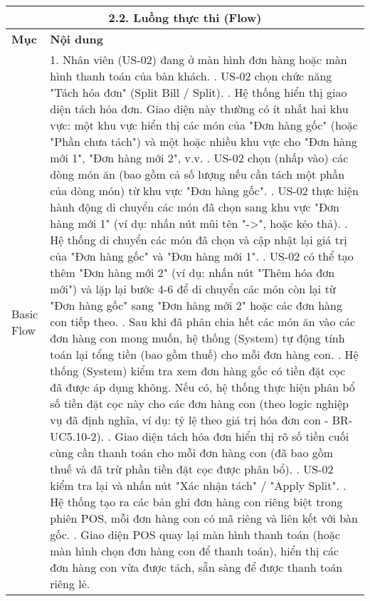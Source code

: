 \begin{longtable}{|m{4cm}|p{11cm}|}
\hline
\multicolumn{2}{|c|}{\textbf{2.2. Luồng thực thi (Flow)}} \\
\hline
\textbf{Mục} & \textbf{Nội dung} \\
\hline
Basic Flow & 1. Nhân viên (US-02) đang ở màn hình đơn hàng hoặc màn hình thanh toán của bàn khách. \newline 2. US-02 chọn chức năng "Tách hóa đơn" (Split Bill / Split). \newline 3. Hệ thống hiển thị giao diện tách hóa đơn. Giao diện này thường có ít nhất hai khu vực: một khu vực hiển thị các món của "Đơn hàng gốc" (hoặc "Phần chưa tách") và một hoặc nhiều khu vực cho "Đơn hàng mới 1", "Đơn hàng mới 2", v.v. \newline 4. US-02 chọn (nhấp vào) các dòng món ăn (bao gồm cả số lượng nếu cần tách một phần của dòng món) từ khu vực "Đơn hàng gốc". \newline 5. US-02 thực hiện hành động di chuyển các món đã chọn sang khu vực "Đơn hàng mới 1" (ví dụ: nhấn nút mũi tên "->", hoặc kéo thả). \newline 6. Hệ thống di chuyển các món đã chọn và cập nhật lại giá trị của "Đơn hàng gốc" và "Đơn hàng mới 1". \newline 7. US-02 có thể tạo thêm "Đơn hàng mới 2" (ví dụ: nhấn nút "Thêm hóa đơn mới") và lặp lại bước 4-6 để di chuyển các món còn lại từ "Đơn hàng gốc" sang "Đơn hàng mới 2" hoặc các đơn hàng con tiếp theo. \newline 8. Sau khi đã phân chia hết các món ăn vào các đơn hàng con mong muốn, hệ thống (System) tự động tính toán lại tổng tiền (bao gồm thuế) cho mỗi đơn hàng con. \newline 9. Hệ thống (System) kiểm tra xem đơn hàng gốc có tiền đặt cọc đã được áp dụng không. Nếu có, hệ thống thực hiện phân bổ số tiền đặt cọc này cho các đơn hàng con (theo logic nghiệp vụ đã định nghĩa, ví dụ: tỷ lệ theo giá trị hóa đơn con - BR-UC5.10-2). \newline 10. Giao diện tách hóa đơn hiển thị rõ số tiền cuối cùng cần thanh toán cho mỗi đơn hàng con (đã bao gồm thuế và đã trừ phần tiền đặt cọc được phân bổ). \newline 11. US-02 kiểm tra lại và nhấn nút "Xác nhận tách" / "Apply Split". \newline 12. Hệ thống tạo ra các bản ghi đơn hàng con riêng biệt trong phiên POS, mỗi đơn hàng con có mã riêng và liên kết với bàn gốc. \newline 13. Giao diện POS quay lại màn hình thanh toán (hoặc màn hình chọn đơn hàng con để thanh toán), hiển thị các đơn hàng con vừa được tách, sẵn sàng để được thanh toán riêng lẻ. \\

\end{longtable}
